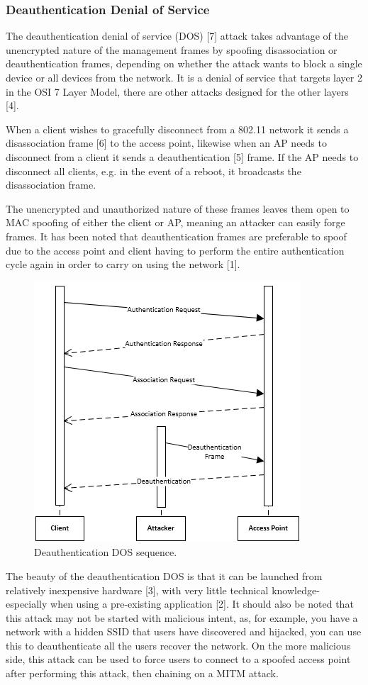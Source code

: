 \subsubsection{Deauthentication Denial of Service}
The deauthentication denial of service (DOS) [7] attack takes advantage of the unencrypted nature of the management frames by spoofing disassociation or deauthentication frames, depending on whether the attack wants to block a single device or all devices from the network. It is a denial of service that targets layer 2 in the OSI 7 Layer Model, there are other attacks designed for the other layers [4].

When a client wishes to gracefully disconnect from a 802.11 network it sends a disassociation frame [6] to the access point, likewise when an AP needs to disconnect from a client it sends a deauthentication [5] frame. If the AP needs to disconnect all clients, e.g. in the event of a reboot, it broadcasts the disassociation frame. 

The unencrypted and unauthorized nature of these frames leaves them open to MAC spoofing of either the client or AP, meaning an attacker can easily forge frames. It has been noted that deauthentication frames are preferable to spoof due to the access point and client having to perform the entire authentication cycle again in order to carry on using the network [1].
\clearpage
\begin{figure}[htbp!]
\centering\includegraphics{research/attackvectors/figures/ddos.png}
\caption{Deauthentication DOS sequence.}
\end{figure}

The beauty of the deauthentication DOS is that it can be launched from relatively inexpensive hardware [3], with very little technical knowledge- especially when using a pre-existing application [2]. It should also be noted that this attack may not be started with malicious intent, as, for example, you have a network with a hidden SSID that users have discovered and hijacked, you can use this to deauthenticate all the users recover the network. On the more malicious side, this attack can be used to force users to connect to a spoofed access point after performing this attack, then chaining on a MITM attack.

